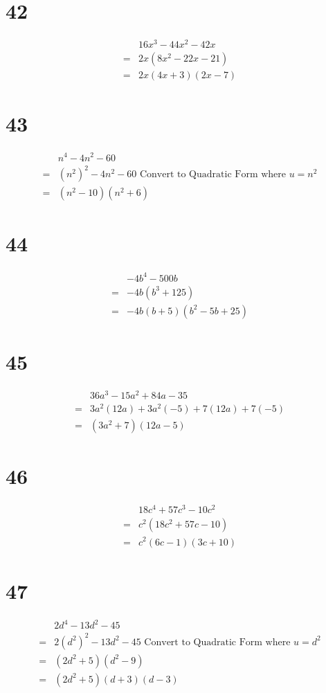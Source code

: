 \documentclass{article}
\theoremstyle{definition}
\begin{document}
\section*{42}
\[
\begin{array}{rl}
	& 16x^3-44x^2-42x \\
=	& 2x(8x^2-22x-21) \\
=	& 2x(4x+3)(2x-7)
\end{array}
\]

\section*{43}
\[
\begin{array}{rl}
	& n^4-4n^2-60 \\
=	& (n^2)^2-4n^2-60\textrm{ Convert to Quadratic Form where $u=n^2$} \\
=	& (n^2-10)(n^2+6)
\end{array}
\]

\section*{44}
\[
\begin{array}{rl}
	& -4b^4-500b \\
=	& -4b(b^3+125) \\
=	& -4b(b+5)(b^2-5b+25)
\end{array}
\]

\section*{45}
\[
\begin{array}{rl}
	& 36a^3-15a^2+84a-35 \\
=	& 3a^2(12a)+3a^2(-5)+7(12a)+7(-5) \\
=	& (3a^2+7)(12a-5)
\end{array}
\]

\section*{46}
\[
\begin{array}{rl}
	& 18c^4+57c^3-10c^2 \\
=	& c^2(18c^2+57c-10) \\
=	& c^2(6c-1)(3c+10)
\end{array}
\]

\section*{47}
\[
\begin{array}{rl}
	& 2d^4-13d^2-45 \\
=	& 2(d^2)^2-13d^2-45\textrm{ Convert to Quadratic Form where $u=d^2$} \\
=	& (2d^2+5)(d^2-9) \\
=	& (2d^2+5)(d+3)(d-3)
\end{array}
\]
\end{document}
